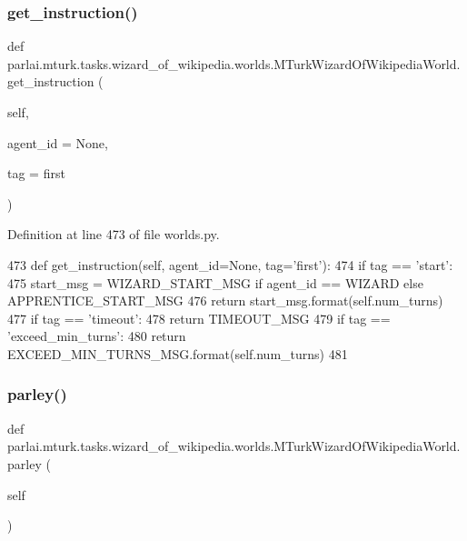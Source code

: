 \subsubsection{\texorpdfstring{get\+\_\+instruction()}{get\_instruction()}}
{\footnotesize\ttfamily def parlai.\+mturk.\+tasks.\+wizard\+\_\+of\+\_\+wikipedia.\+worlds.\+M\+Turk\+Wizard\+Of\+Wikipedia\+World.\+get\+\_\+instruction (\begin{DoxyParamCaption}\item[{}]{self,  }\item[{}]{agent\+\_\+id = {\ttfamily None},  }\item[{}]{tag = {\ttfamily \textquotesingle{}first\textquotesingle{}} }\end{DoxyParamCaption})}



Definition at line 473 of file worlds.\+py.


\begin{DoxyCode}
473     \textcolor{keyword}{def }get\_instruction(self, agent\_id=None, tag='first'):
474         \textcolor{keywordflow}{if} tag == \textcolor{stringliteral}{'start'}:
475             start\_msg = WIZARD\_START\_MSG \textcolor{keywordflow}{if} agent\_id == WIZARD \textcolor{keywordflow}{else} APPRENTICE\_START\_MSG
476             \textcolor{keywordflow}{return} start\_msg.format(self.num\_turns)
477         \textcolor{keywordflow}{if} tag == \textcolor{stringliteral}{'timeout'}:
478             \textcolor{keywordflow}{return} TIMEOUT\_MSG
479         \textcolor{keywordflow}{if} tag == \textcolor{stringliteral}{'exceed\_min\_turns'}:
480             \textcolor{keywordflow}{return} EXCEED\_MIN\_TURNS\_MSG.format(self.num\_turns)
481 
\end{DoxyCode}
\mbox{\label{classparlai_1_1mturk_1_1tasks_1_1wizard__of__wikipedia_1_1worlds_1_1MTurkWizardOfWikipediaWorld_a3b3cf41071bac1da0053627118f61d58}} 
\subsubsection{\texorpdfstring{parley()}{parley()}}
{\footnotesize\ttfamily def parlai.\+mturk.\+tasks.\+wizard\+\_\+of\+\_\+wikipedia.\+worlds.\+M\+Turk\+Wizard\+Of\+Wikipedia\+World.\+parley (\begin{DoxyParamCaption}\item[{}]{self }\end{DoxyParamCaption})}

